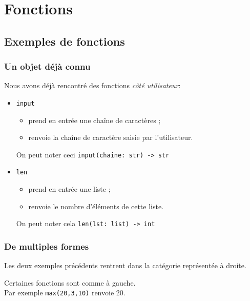 \chapter{Fonctions}
\section{Exemples de fonctions}
\subsection{Un objet déjà connu}
Nous avons déjà rencontré des fonctions \textit{côté utilisateur}:
\begin{itemize}
    \item \texttt{input}
          \begin{itemize}
              \item prend en entrée une chaîne de caractères ;
              \item renvoie la chaîne de caractère saisie par l'utilisateur.
          \end{itemize}
          On peut noter ceci \texttt{input(chaine: str) -> str}
    \item \texttt{len}
          \begin{itemize}
              \item prend en entrée une liste ;
              \item renvoie le nombre d'éléments de cette liste.
          \end{itemize}
          On peut noter cela \texttt{len(lst: list) -> int}
\end{itemize}

\subsection{De multiples formes}
{Les deux exemples précédents rentrent dans la catégorie représentée à droite.}
\medskip\par


{Certaines fonctions sont comme à gauche.\\
    Par exemple \texttt{max(20,3,10)} renvoie 20.}
\medskip\par


\\[2em]


